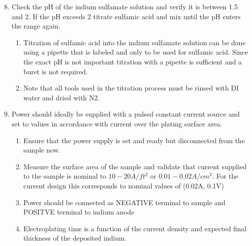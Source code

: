 \begin{center} %
    \begin{framed} %
        \begin{minipage}{0.8\textwidth} %
        \raggedright %

        \begin{enumerate}
            \setcounter{enumi}{7}
            \item Check the pH of the indium sulfamate solution and verify it is between 1.5 and 2. If the pH exceeds 2 titrate sulfamic acid and mix until the pH enters the range again.
            \begin{enumerate}
                \item Titration of sulfamic acid into the indium sulfamate solution can be done using a pipette that is labeled and only to be used for sulfamic acid. Since the exact pH is not important titration with a pipette is sufficient and a buret is not required.
                \item Note that all tools used in the titration process must be rinsed with DI water and dried with N2.
            \end{enumerate}

            \item Power should ideally be supplied with a pulsed constant current source and set to values in accordance with current over the plating surface area.
            \begin{enumerate}
                \item Ensure that the power supply is set and ready but disconnected from the sample now.
                \item Measure the surface area of the sample and validate that current supplied to the sample is nominal to $10-20A/ft^2$ or $0.01-0.02A/cm^2$. For the current design this corresponds to nominal values of (0.02A, 0.1V)
                \item Power should be connected as NEGATIVE terminal to sample and POSITVE terminal to indium anode
                \item Electroplating time is a function of the current density and expected final thickness of the deposited indium.
            \end{enumerate}


\end{enumerate}
\end{minipage}
\end{framed}
\end{center}
